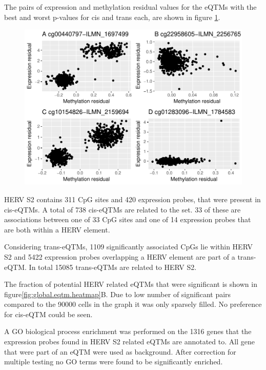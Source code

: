 \documentclass[a4paper,12pt,twoside,openright]{report}
\begin{document}
The pairs of expression and methylation residual values for the eQTMs with the best and worst p-values for cis and trans each, are shown in figure \ref{fig:best.worst.eqtm.scatter}. 
\begin{figure}[tb]
	\includegraphics[scale = 1, keepaspectratio = true]{../figures/best_worst_eqtm_scatter.pdf}  
	\caption{}
    \label{fig:best.worst.eqtm.scatter}
\end{figure}

HERV S2 contains 311 CpG sites and 420 expression probes, that were present in cis-eQTMs. A total of 738 cis-eQTMs are related to the set. 33 of these are associations between one of 33 CpG sites and one of 14 expression probes that are both  within a HERV element. 

Considering trans-eQTMs, 1109 significantly associated CpGs lie within HERV S2 and 5422 expression probes overlapping a HERV element are part of a trans-eQTM. In total 15085 trans-eQTMs are related to HERV S2.

The fraction of potential HERV related eQTMs that were significant is shown in figure\ref{fig:global.eqtm.heatmap}B. Due to low number of significant pairs compared to the 90000 cells in the graph it was only sparsely filled. No preference for cis-eQTM could be seen. 

A GO biological process enrichment was performed on the 1316 genes that the expression probes found in HERV S2 related eQTMs are annotated to. All gene that were part of an eQTM were used as background. After correction for multiple testing no GO terms were found to be significantly enriched. 
\end{document}
